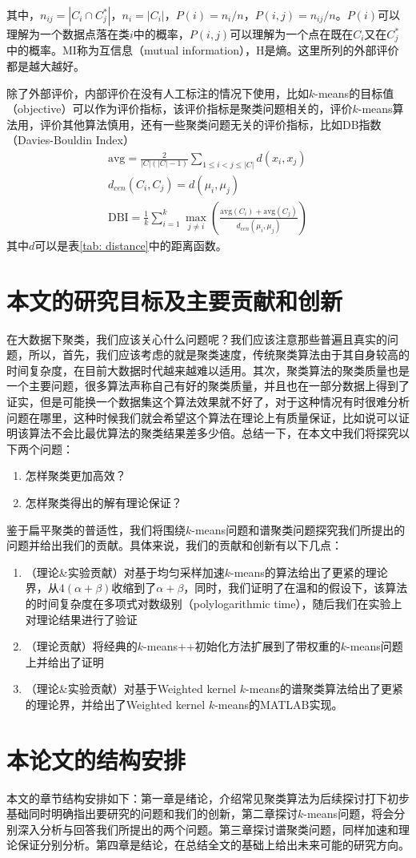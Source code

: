 其中，$n_{ij}=|C_i \cap C_j^*|$，$n_i = |C_i|$，$P(i) = n_i/n$，$P(i,j)=n_{ij}/n$。$P(i)$可以理解为一个数据点落在类$i$中的概率，$P(i,j)$可以理解为一个点在既在$C_i$又在$C_j^*$中的概率。MI称为互信息（mutual information），H是熵。这里所列的外部评价都是越大越好。

除了外部评价，内部评价在没有人工标注的情况下使用，比如$k$-means的目标值（objective）可以作为评价指标，该评价指标是聚类问题相关的，评价$k$-means算法用，评价其他算法慎用，还有一些聚类问题无关的评价指标，比如DB指数（Davies-Bouldin Index）
\begin{gather*}
    \text{avg} = \frac{2}{|C|(|C|-1)}\sum_{1\leq i<j \leq |C| }d(x_i,x_j) \\
    d_{cen}(C_i,C_j) = d(\mu_i,\mu_j) \\
    \text{DBI} = \frac{1}{k}\sum_{i=1}^k \max_{j \neq i} (\frac{\text{avg}(C_i)+\text{avg}(C_j)}{d_{cen}(\mu_i,\mu_j)})
\end{gather*}
其中$d$可以是表\ref{tab: distance}中的距离函数。

\section{本文的研究目标及主要贡献和创新}
在大数据下聚类，我们应该关心什么问题呢？我们应该注意那些普遍且真实的问题，所以，首先，我们应该考虑的就是聚类速度，传统聚类算法由于其自身较高的时间复杂度，在目前大数据时代越来越难以适用。其次，聚类算法的聚类质量也是一个主要问题，很多算法声称自己有好的聚类质量，并且也在一部分数据上得到了证实，但是可能换一个数据集这个算法效果就不好了，对于这种情况有时很难分析问题在哪里，这种时候我们就会希望这个算法在理论上有质量保证，比如说可以证明该算法不会比最优算法的聚类结果差多少倍。总结一下，在本文中我们将探究以下两个问题：
\begin{enumerate}
    \item 怎样聚类更加高效？
    \item 怎样聚类得出的解有理论保证？
\end{enumerate}
鉴于扁平聚类的普适性，我们将围绕$k$-means问题和谱聚类问题探究我们所提出的问题并给出我们的贡献。具体来说，我们的贡献和创新有以下几点：
\begin{enumerate}
    \item （理论\&实验贡献）对基于均匀采样加速$k$-means的算法给出了更紧的理论界，从$4(\alpha+\beta)$收缩到了$\alpha+\beta$，同时，我们证明了在温和的假设下，该算法的时间复杂度在多项式对数级别（polylogarithmic time），随后我们在实验上对理论结果进行了验证
    \item （理论贡献）将经典的$k$-means++初始化方法扩展到了带权重的$k$-means问题上并给出了证明
    \item （理论\&实验贡献）对基于Weighted kernel $k$-means的谱聚类算法给出了更紧的理论界，并给出了Weighted kernel $k$-means的MATLAB实现。
\end{enumerate}

\section{本论文的结构安排}
本文的章节结构安排如下：第一章是绪论，介绍常见聚类算法为后续探讨打下初步基础同时明确指出要研究的问题和我们的创新，第二章探讨$k$-means问题，将会分别深入分析与回答我们所提出的两个问题。第三章探讨谱聚类问题，同样加速和理论保证分别分析。第四章是结论，在总结全文的基础上给出未来可能的研究方向。